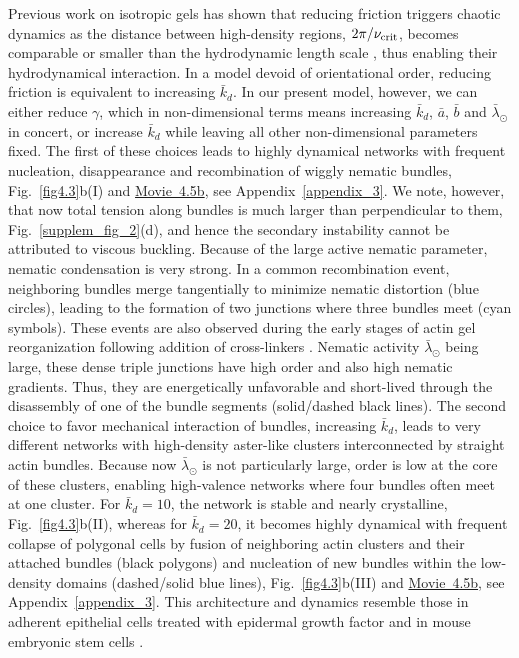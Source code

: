Previous work on isotropic gels has shown that reducing friction triggers chaotic dynamics as the distance between high-density regions, $2\pi/\nu_{\rm crit}$, becomes comparable or smaller than the hydrodynamic length scale  \cite{hannezo2015}, thus enabling their hydrodynamical interaction. In a model devoid of orientational order, reducing friction is equivalent to increasing $\bar{k}_d$. In our present model, however, we can either reduce $\gamma$, which in non-dimensional terms means increasing $\bar{k}_d$, $\bar{a}$, $\bar{b}$ and $\bar{\lambda}_\odot$ in concert, or increase $\bar{k}_d$ while leaving all other non-dimensional parameters fixed. The first of these choices leads to highly dynamical networks with frequent nucleation, disappearance and recombination of wiggly nematic bundles, Fig.~\ref{fig4.3}b(I) and  \href{https://github.com/waleedmirzaPhD/movies_thesis.git}{Movie~4.5b}, see Appendix~\ref{appendix_3}. We note, however, that  now total tension along bundles is much larger than perpendicular to them, Fig.~\ref{supplem_fig_2}(d), and hence the secondary instability cannot be attributed to viscous buckling. Because of the large active nematic parameter, nematic condensation is very strong. In a common recombination event, neighboring bundles merge tangentially to minimize nematic distortion (blue circles), leading to the formation of two junctions where three bundles meet (cyan symbols). These events are also observed during the early stages of actin gel reorganization following addition of cross-linkers \cite{weirich2017}. Nematic activity  $\bar{\lambda}_\odot$ being large, these dense triple junctions have high order and also high nematic gradients. Thus, they are energetically unfavorable and short-lived through the disassembly of one of the bundle segments (solid/dashed black lines).  The second choice to favor mechanical interaction of bundles, increasing $\bar{k}_d$, leads to very different networks with high-density aster-like clusters interconnected by straight actin bundles. Because now $\bar{\lambda}_\odot$ is not particularly large, order is low at the core of these clusters, enabling high-valence networks where four bundles often meet at one cluster. For $\bar{k}_d=10$, the network is stable and nearly crystalline, Fig.~\ref{fig4.3}b(II), whereas for $\bar{k}_d=20$, it becomes highly dynamical with frequent collapse of polygonal cells by fusion of neighboring actin clusters and their attached bundles (black polygons) and nucleation of new bundles within the low-density domains (dashed/solid blue lines), Fig.~\ref{fig4.3}b(III) and  \href{https://github.com/waleedmirzaPhD/movies_thesis.git}{Movie~4.5b}, see Appendix~\ref{appendix_3}. This architecture and dynamics resemble those in adherent epithelial cells treated with epidermal growth factor \cite{jalal2019} and in mouse embryonic stem cells \cite{xia2019}.

